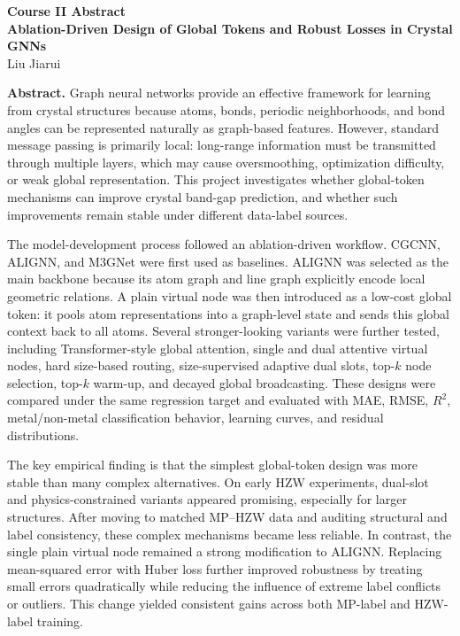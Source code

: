 \documentclass[11pt,a4paper]{article}
\begin{document}
\begin{center}
{\Large\bfseries Course II Abstract}\\[0.35em]
{\bfseries Ablation-Driven Design of Global Tokens and Robust Losses in Crystal GNNs}\\[0.25em]
Liu Jiarui
\end{center}

\textbf{Abstract.}
Graph neural networks provide an effective framework for learning from crystal structures because atoms, bonds, periodic neighborhoods, and bond angles can be represented naturally as graph-based features. However, standard message passing is primarily local: long-range information must be transmitted through multiple layers, which may cause oversmoothing, optimization difficulty, or weak global representation. This project investigates whether global-token mechanisms can improve crystal band-gap prediction, and whether such improvements remain stable under different data-label sources.

The model-development process followed an ablation-driven workflow. CGCNN, ALIGNN, and M3GNet were first used as baselines. ALIGNN was selected as the main backbone because its atom graph and line graph explicitly encode local geometric relations. A plain virtual node was then introduced as a low-cost global token: it pools atom representations into a graph-level state and sends this global context back to all atoms. Several stronger-looking variants were further tested, including Transformer-style global attention, single and dual attentive virtual nodes, hard size-based routing, size-supervised adaptive dual slots, top-\(k\) node selection, top-\(k\) warm-up, and decayed global broadcasting. These designs were compared under the same regression target and evaluated with MAE, RMSE, \(R^2\), metal/non-metal classification behavior, learning curves, and residual distributions.

The key empirical finding is that the simplest global-token design was more stable than many complex alternatives. On early HZW experiments, dual-slot and physics-constrained variants appeared promising, especially for larger structures. After moving to matched MP--HZW data and auditing structural and label consistency, these complex mechanisms became less reliable. In contrast, the single plain virtual node remained a strong modification to ALIGNN. Replacing mean-squared error with Huber loss further improved robustness by treating small errors quadratically while reducing the influence of extreme label conflicts or outliers. This change yielded consistent gains across both MP-label and HZW-label training.
\end{document}
